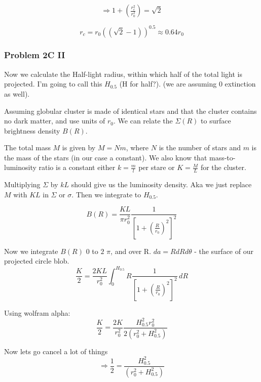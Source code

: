 \begin{equation}
\Rightarrow 1 + \left(\tfrac{r_c^2}{r_0^2}\right) = \sqrt{2}
\end{equation}


\begin{equation}
\boxed{r_c = r_0((\sqrt{2} -1 ))^{0.5}} \approx 0.64r_0
\end{equation}


\subsubsection*{Problem 2C II}
Now we calculate the Half-light radius, within which half of the total light is projected. I'm going to call this $H_{0.5}$ (H for half?). (we are assuming 0 extinction as well).

Assuming globular cluster is made of identical stars and that the cluster contains no dark matter, and use units of $r_0$.  We can relate the $\Sigma(R)$ to surface brightness density $B(R)$. 

The total mass $M$ is given by $ M = Nm$, where $N$ is the number of stars and $m$ is the mass of the stars (in our case a constant). We also know that mass-to-luminosity ratio is a constant either $k = \frac{m}{l}$ per stare or $K = \frac{M}{L}$ for the cluster.

Multiplying $\Sigma$ by $kL$ should give us the luminosity density. Aka we just replace $M$ with $KL$ in $\Sigma $ or $\sigma$. Then we integrate to $H_{0.5}$. 

\begin{equation}
B(R) = \frac{KL}{\pi r_0^2}\frac{1}{\left[1 + \left(\tfrac{R}{r_0}\right)^2\right]^2}
\end{equation}

Now we integrate $B(R)$ $0$ to $2$ $\pi$, and over R. $da = RdRd\theta$ - the surface of our projected circle blob. 
\begin{equation}
\frac{K}{2} = \frac{2KL}{ r_0^2} \int_{0}^{H_{0.5}} R\frac{1}{\left[1 + \left(\tfrac{R}{r_0}\right)^2\right]^2} \, dR
\end{equation}

Using wolfram alpha:
\begin{equation}
\frac{K}{2} =   \frac{2K}{r_0^2} \frac{H_{0.5}^2r_0^2}{2(r_0^2 + H_{0.5}^2)}
\end{equation}

Now lets go cancel a lot of things
\begin{equation}
    \Rightarrow \frac{1}{2} = \frac{H_{0.5}^2}{(r_0^2 + H_{0.5}^2)}
\end{equation}

